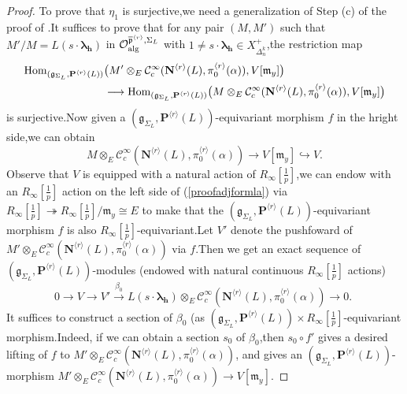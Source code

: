 \documentclass[SecEq,CM,GP]{degruyter-crelle} %
\theoremstyle{plain}
\newcommand{\alge}{{\rm alg}}
\newcommand{\homo}{{\rm Hom}}
\newcommand{\lrr}{{\langle r\rangle}}
\newcommand{\bN}{{\mathbf{N}}}
\newcommand{\bP}{{\mathbf{P}}}
\newcommand{\bh}{{\mathbf{h}}}
\newcommand{\cC}{\mathcal C}
\newcommand{\cO}{\mathcal O}
\newcommand{\fm}{{\mathfrak{m}}}
\newcommand{\fp}{{\mathfrak{p}}}
\begin{document}
\begin{proof}
To prove that $\eta_1$ is surjective,\;we need a generalization of Step (c) of the proof of \cite[Proposition 4.7]{2019DINGSimple}.\;It suffices to prove that for any pair $(M,M')$ such that $M'/M=L(s\cdot{\bm\lambda}_\bh)$ in $\cO_{\alge}^{\overline{\fp}^{\lrr},\Sigma_L}$ with $1\neq s\cdot{\bm\lambda}_\bh\in X^+_{\Delta_n^k}$,\;the restriction map
\begin{equation*}
	\begin{aligned}
		\homo_{(\mathfrak{g}_{\Sigma_L},\bP^{\lrr}(L))}&\big(M'\otimes_E\cC^{\infty}_c(\bN^{\lrr}(L),\pi_0^{\lrr}(\alpha)),V[\fm_y]\big)\\
		&\longrightarrow \homo_{(\mathfrak{g}_{\Sigma_L},\bP^{\lrr}(L))}\big(M\otimes_E\cC^{\infty}_c(\bN^{\lrr}(L),\pi_0^{\lrr}(\alpha)),V[\fm_y]\big)
	\end{aligned}
\end{equation*}
is surjective.\;Now given a $(\mathfrak{g}_{\Sigma_L},\bP^{\lrr}(L))$-equivariant morphism $f$ in the hright side,\;we can obtain
\begin{equation}\label{proofadjformla}
	M\otimes_E\cC^{\infty}_c(\bN^{\lrr}(L),\pi_0^{\lrr}(\alpha))\rightarrow V[\fm_y]\hookrightarrow V.
\end{equation}
Observe that $V$ is equipped with a natural action of $R_{\infty}[\frac{1}{p}]$,\;we can endow with an $R_{\infty}[\frac{1}{p}]$ action on the left side of (\ref{proofadjformla}) via $R_{\infty}[\frac{1}{p}]\twoheadrightarrow R_{\infty}[\frac{1}{p}]/\fm_y\cong E$ to make that the $(\mathfrak{g}_{\Sigma_L},\bP^{\lrr}(L))$-equivariant morphism $f$ is also $R_{\infty}[\frac{1}{p}]$-equivariant.\;Let $V'$ denote the pushfoward of $M'\otimes_E\cC^{\infty}_c(\bN^{\lrr}(L),\pi_0^{\lrr}(\alpha))$ via $f$.\;Then we get an exact sequence of  $(\mathfrak{g}_{\Sigma_L},\bP^{\lrr}(L))$-modules (endowed with natural  continuous $R_{\infty}[\frac{1}{p}]$ actions)
\begin{equation}\label{adjuncitonexact1}
	0\rightarrow V \rightarrow  V' \xrightarrow{\beta_0} L(s\cdot{\bm\lambda}_\bh)\otimes_E\cC^{\infty}_c(\bN^{\lrr}(L),\pi_0^{\lrr}(\alpha))
	\rightarrow0.\;
\end{equation}
It suffices to construct  a section of $\beta_0$ (as $(\mathfrak{g}_{\Sigma_L},\bP^{\lrr}(L))\times R_{\infty}[\frac{1}{p}] $-equivariant morphism.\;Indeed, if we can obtain a section $s_0$ of $\beta_0 $,\;then $s_0\circ f'$ gives a desired lifting of $f$ to $M'\otimes_E\cC^{\infty}_c(\bN^{\lrr}(L),\pi_0^{\lrr}(\alpha))$, and gives an $(\mathfrak{g}_{\Sigma_L},\bP^{\lrr}(L))$-morphism $M'\otimes_E\cC^{\infty}_c(\bN^{\lrr}(L),\pi_0^{\lrr}(\alpha))\rightarrow V[\fm_y]$.\;

\end{proof}
\end{document}
